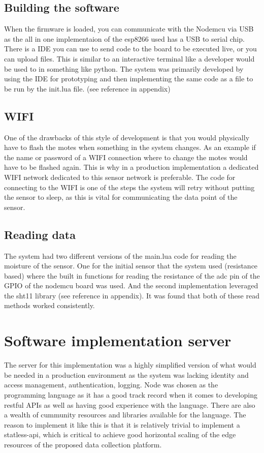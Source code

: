\documentclass[]{uiophd}
\begin{document}
\subsection{Building the software}
When the firmware is loaded, you can communicate with the Nodemcu via USB as the all in one implementaion of the esp8266 used has a USB to serial chip. There is a IDE you can use to send code to the board to be executed live, or you can upload files. This is similar to an interactive terminal like a developer would be used to in something like python. The system was primarily developed by using the IDE for prototyping and then implementing the same code as a file to be run by the init.lua file. (see reference in appendix)
\subsection{WIFI}
One of the drawbacks of this style of development is that you would physically have to flash the motes when something in the system changes. As an example if the name or password of a WIFI connection where to change the motes would have to be flashed again. This is why in a production implementation a dedicated WIFI network dedicated to this sensor network is preferable. The code for connecting to the WIFI is one of the steps the system will retry without putting the sensor to sleep, as this is vital for communicating the data point of the sensor.
\subsection{Reading data}
The system had two different versions of the main.lua code for reading the moisture of the sensor. One for the initial sensor that the system used (resistance based) where the built in functions for reading the resistance of the adc pin of the GPIO of the nodemcu board was used. And the second implementation leveraged the sht11 library (see reference in appendix). It was found that both of these read methods worked consistently.
\section{Software implementation server}
The server for this implementation was a highly simplified version of what would be needed in a production environment as the system was lacking identity and access management, authentication, logging. Node was chosen as the programming language as it has a good track record when it comes to developing restful APIs as well as having good experience with the language. There are also a wealth of cummunity resources and libraries available for the language. The reason to implement it like this is that it is relatively trivial to implement a statless-api, which is critical to achieve good horizontal scaling of the edge resources of the proposed data collection platform.
\end{document}
